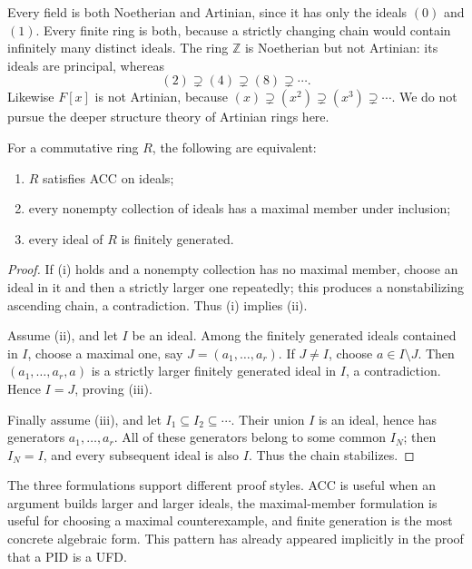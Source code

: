 Every field is both Noetherian and Artinian, since it has only the ideals
\((0)\) and \((1)\).  Every finite ring is both, because a strictly changing
chain would contain infinitely many distinct ideals.  The ring \(\mathbb Z\)
is Noetherian but not Artinian: its ideals are principal, whereas
\[
(2)\supsetneq(4)\supsetneq(8)\supsetneq\cdots.
\]
Likewise \(F[x]\) is not Artinian, because
\((x)\supsetneq(x^2)\supsetneq(x^3)\supsetneq\cdots\).  We do not pursue
the deeper structure theory of Artinian rings here.

\begin{theorem}
For a commutative ring \(R\), the following are equivalent:
\begin{enumerate}
\item \(R\) satisfies ACC on ideals;
\item every nonempty collection of ideals has a maximal member under inclusion;
\item every ideal of \(R\) is finitely generated.
\end{enumerate}
\end{theorem}
\begin{proof}
If (i) holds and a nonempty collection has no maximal member, choose an ideal
in it and then a strictly larger one repeatedly; this produces a nonstabilizing
ascending chain, a contradiction.  Thus (i) implies (ii).

Assume (ii), and let \(I\) be an ideal.  Among the finitely generated ideals
contained in \(I\), choose a maximal one, say \(J=(a_1,\ldots,a_r)\).  If
\(J\ne I\), choose \(a\in I\setminus J\).  Then
\((a_1,\ldots,a_r,a)\) is a strictly larger finitely generated ideal in
\(I\), a contradiction.  Hence \(I=J\), proving (iii).

Finally assume (iii), and let \(I_1\subseteq I_2\subseteq\cdots\).  Their
union \(I\) is an ideal, hence has generators \(a_1,\ldots,a_r\).  All of
these generators belong to some common \(I_N\); then \(I_N=I\), and every
subsequent ideal is also \(I\).  Thus the chain stabilizes.
\end{proof}

The three formulations support different proof styles.  ACC is useful when
an argument builds larger and larger ideals, the maximal-member formulation
is useful for choosing a maximal counterexample, and finite generation is the
most concrete algebraic form.  This pattern has already appeared implicitly
in the proof that a PID is a UFD.

